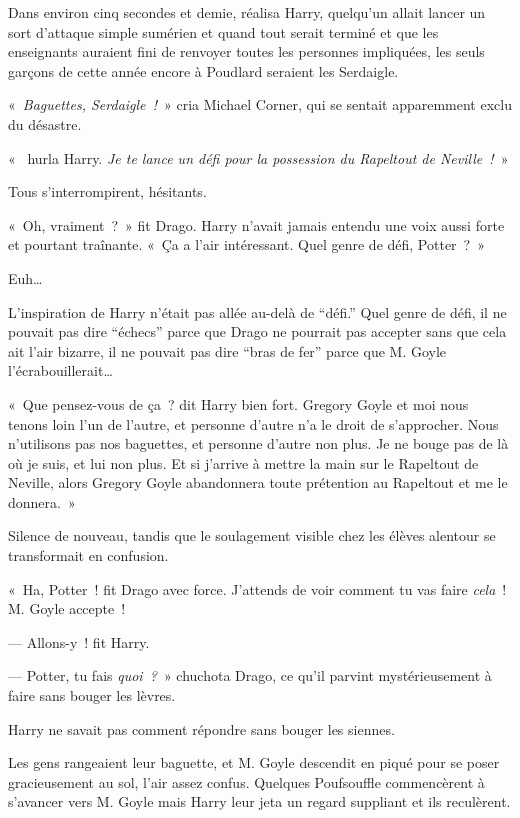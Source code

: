 Dans environ cinq secondes et demie, réalisa Harry, quelqu'un allait lancer un sort d'attaque simple sumérien et quand tout serait terminé et que les enseignants auraient fini de renvoyer toutes les personnes impliquées, les seuls garçons de cette année encore à Poudlard seraient les Serdaigle.

«~\emph{Baguettes, Serdaigle~!}~» cria Michael Corner, qui se sentait apparemment exclu du désastre.

«~ hurla Harry.
\emph{Je te lance un défi pour la possession du Rapeltout de Neville~!}~»

Tous s'interrompirent, hésitants.

«~Oh, vraiment~?~»
fit Drago.
Harry n'avait jamais entendu une voix aussi forte et pourtant traînante.
«~Ça a l'air intéressant.
Quel genre de défi, Potter~?~»

Euh…

L'inspiration de Harry n'était pas allée au-delà de “défi.”
Quel genre de défi, il ne pouvait pas dire “échecs” parce que Drago ne pourrait pas accepter sans que cela ait l'air bizarre, il ne pouvait pas dire “bras de fer” parce que M. Goyle l'écrabouillerait…

«~Que pensez-vous de ça~? dit Harry bien fort.
Gregory Goyle et moi nous tenons loin l'un de l'autre, et personne d'autre n'a le droit de s'approcher.
Nous n'utilisons pas nos baguettes, et personne d'autre non plus.
Je ne bouge pas de là où je suis, et lui non plus.
Et si j'arrive à mettre la main sur le Rapeltout de Neville, alors Gregory Goyle abandonnera toute prétention au Rapeltout et me le donnera.~»

Silence de nouveau, tandis que le soulagement visible chez les élèves alentour se transformait en confusion.

«~Ha, Potter~! fit Drago avec force.
J'attends de voir comment tu vas faire \emph{cela}~!
M. Goyle accepte~!

--- Allons-y~! fit Harry.

--- Potter, tu fais \emph{quoi~?}~» chuchota Drago, ce qu'il parvint mystérieusement à faire sans bouger les lèvres.

Harry ne savait pas comment répondre sans bouger les siennes.

Les gens rangeaient leur baguette, et M. Goyle descendit en piqué pour se poser gracieusement au sol, l'air assez confus.
Quelques Poufsouffle commencèrent à s'avancer vers M. Goyle mais Harry leur jeta un regard suppliant et ils reculèrent.

